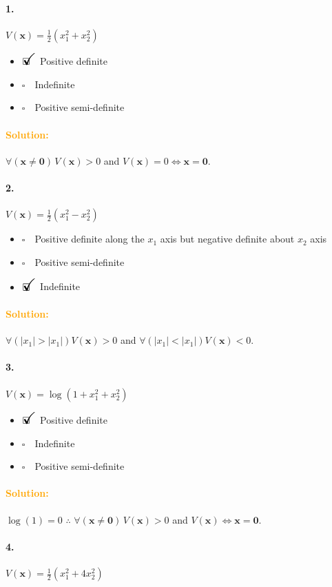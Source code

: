 \documentclass[12pt, a4paper]{article}
\newcommand{\ans}{\item[]$\rlap{\LARGE{\checkmark}}\square\quad$}
\newcommand{\noans}{\item[]$\square\quad$}
\begin{document}
\paragraph{1.}
$V(\bm{x}) = \frac{1}{2}(x_{1}^{2}+x_{2}^{2})$

\begin{itemize}
\ans Positive definite
\noans Indefinite
\noans Positive semi-definite
\end{itemize}

\paragraph{\textcolor{orange}{Solution:}}$\forall(\bm{x}\neq\bm{0})\,V(\bm{x})>0$ and $V(\bm{x})=0\iff\bm{x}=\bm{0}$. 

\paragraph{2.}
$V(\bm{x}) = \frac{1}{2}(x_{1}^{2}-x_{2}^{2})$

\begin{itemize}
\noans Positive definite along the $x_{1}$ axis but negative definite about $x_{2}$ axis
\noans Positive semi-definite
\ans Indefinite
\end{itemize}

\paragraph{\textcolor{orange}{Solution:}}$\forall(|x_{1}|>|x_{1}|) V(\bm{x})>0$ and $\forall(|x_{1}|<|x_{1}|) V(\bm{x})<0$. 

\paragraph{3.}
$V(\bm{x}) = \log(1+x_{1}^{2}+x_{2}^{2})$

\begin{itemize}
\ans Positive definite
\noans Indefinite
\noans Positive semi-definite
\end{itemize}

\paragraph{\textcolor{orange}{Solution:}}$\log(1)=0$ $\therefore$ $\forall(\bm{x}\neq\bm{0})\,V(\bm{x})>0$ and $V(\bm{x})\iff\bm{x}=\bm{0}$.

\paragraph{4.}
$V(\bm{x}) = \frac{1}{2}(x_{1}^{2}+4x_{2}^{2})$
\end{document}
